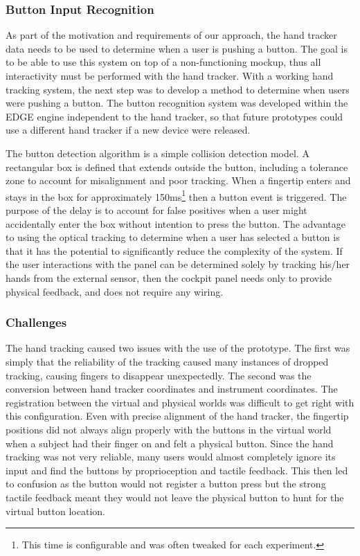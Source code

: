 \subsubsection{Button Input Recognition}
\label{sec:proto_button_input}

As part of the motivation and requirements of our approach, the hand tracker data needs to be used to determine when a user is pushing a button.
The goal is to be able to use this system on top of a non-functioning mockup, thus all interactivity must be performed with the hand tracker.
With a working hand tracking system, the next step was to develop a method to determine when users were pushing a button.
The button recognition system was developed within the EDGE engine independent to the hand tracker, so that future prototypes could use a different hand tracker if a new device were released.

The button detection algorithm is a simple collision detection model.
A rectangular box is defined that extends outside the button, including a tolerance zone to account for misalignment and poor tracking.
When a fingertip enters and stays in the box for approximately 150ms\footnote{This time is configurable and was often tweaked for each experiment.} then a button event is triggered.
The purpose of the delay is to account for false positives when a user might accidentally enter the box without intention to press the button.
The advantage to using the optical tracking to determine when a user has selected a button is that it has the potential to significantly reduce the complexity of the system.
If the user interactions with the panel can be determined solely by tracking his/her hands from the external sensor, then the cockpit panel needs only to provide physical feedback, and does not require any wiring.

\subsubsection{Challenges}

The hand tracking caused two issues with the use of the prototype.
The first was simply that the reliability of the tracking caused many instances of dropped tracking, causing fingers to disappear unexpectedly.
The second was the conversion between hand tracker coordinates and instrument coordinates.
The registration between the virtual and physical worlds was difficult to get right with this configuration.
Even with precise alignment of the hand tracker, the fingertip positions did not always align properly with the buttons in the virtual world when a subject had their finger on and felt a physical button.
Since the hand tracking was not very reliable, many users would almost completely ignore its input and find the buttons by proprioception and tactile feedback.
This then led to confusion as the button would not register a button press but the strong tactile feedback meant they would not leave the physical button to hunt for the virtual button location.

